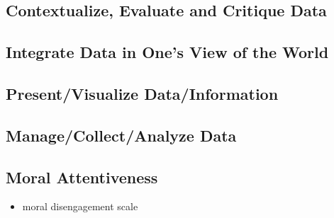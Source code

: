 \documentclass[
  12pt,
  a4paper,
  twoside]{article}
\providecommand{\tightlist}{%
  \setlength{\itemsep}{0pt}\setlength{\parskip}{0pt}}
\begin{document}
\hypertarget{contextualize-evaluate-and-critique-data}{%
\subsection{Contextualize, Evaluate and Critique Data}\label{contextualize-evaluate-and-critique-data}}

\hypertarget{integrate-data-in-ones-view-of-the-world}{%
\subsection{Integrate Data in One's View of the World}\label{integrate-data-in-ones-view-of-the-world}}

\hypertarget{presentvisualize-datainformation}{%
\subsection{Present/Visualize Data/Information}\label{presentvisualize-datainformation}}

\hypertarget{managecollectanalyze-data}{%
\subsection{Manage/Collect/Analyze Data}\label{managecollectanalyze-data}}

\hypertarget{moral-attentiveness}{%
\subsection{Moral Attentiveness}\label{moral-attentiveness}}

\begin{itemize}
\tightlist
\item
  moral disengagement scale
\end{itemize}
\end{document}
